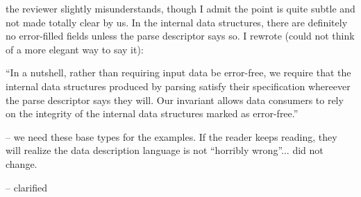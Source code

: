 the reviewer slightly misunderstands, though I admit the point is quite 
subtle and not made totally clear by us.
In the internal data structures, there are definitely no error-filled fields
unless the parse descriptor says so.
I rewrote (could not think of a more elegant way to say it):

``In a nutshell, rather than requiring input data be error-free, we require
that the internal data structures produced by parsing 
satisfy their specification whereever the parse descriptor says they
will.  Our invariant allows
data consumers to rely on the integrity of the internal data structures
marked as error-free.''



-- we need these base types for the examples.  If the reader keeps reading,
they will realize the data description language is not ``horribly wrong''...
did not change.


-- clarified


